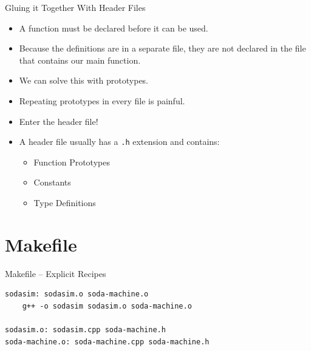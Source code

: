 \documentclass[]{beamer}
\begin{document}
\begin{frame}{Gluing it Together With Header Files}
    \begin{itemize}[<+->]
        \item A function must be declared before it can be used.
        \item Because the definitions are in a separate file, they are
            not declared in the file that contains our main function.
        \item We can solve this with prototypes.
        \item Repeating prototypes in every file is painful.
        \item Enter the header file!  
        \item A header file usually has a \texttt{.h} extension and
            contains:
            \begin{itemize}
                \item Function Prototypes
                \item Constants
                \item Type Definitions
            \end{itemize}
    \end{itemize}
\end{frame}

\section{Makefile}
\begin{frame}[fragile]{Makefile -- Explicit Recipes}
\begin{adjustbox}{max width=\textwidth, max totalheight=0.9\textheight}
\begin{BVerbatim}
sodasim: sodasim.o soda-machine.o
    g++ -o sodasim sodasim.o soda-machine.o

sodasim.o: sodasim.cpp soda-machine.h
soda-machine.o: soda-machine.cpp soda-machine.h
\end{BVerbatim}
\end{adjustbox}
\end{frame}
\end{document}
